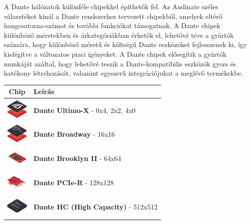 A Dante hálózatok különféle chipekkel építhetők fel. Az Audinate széles választékot 
kínál a Dante rendszerhez tervezett chipekből, amelyek eltérő hangcsatorna-számot 
és további funkciókat támogatnak. A Dante chipek különböző méretekben és árkategóriákban 
érhetők el, lehetővé téve a gyártók számára, hogy különböző méretű és költségű Dante 
eszközöket fejlesszenek ki, így kielégítve a változatos piaci igényeket. A Dante chipek 
elősegítik a gyártók munkáját azáltal, hogy lehetővé teszik a Dante-kompatibilis eszközök 
gyors és hatékony létrehozását, valamint egyszerű integrációjukat a meglévő termékekbe.


\begin{center}
	\begin{tabular}{|c|p{10cm}|}
		\hline
		\textbf{Chip} & \textbf{Leírás} \\
		\hline
		\includegraphics[width=40px,height=40px,keepaspectratio]{figures/ultimo-x.jpg} & \textbf{Dante Ultimo-X} - 0x4, 2x2, 4x0 \\
		\hline
		\includegraphics[width=40px,height=40px,keepaspectratio]{figures/broadway.jpg} & \textbf{Dante Broadway} - 16x16 \\
		\hline
		\includegraphics[width=40px,height=40px,keepaspectratio]{figures/brooklyn-ii.jpg} & \textbf{Dante Brooklyn II} - 64x64 \\
		\hline
		\includegraphics[width=40px,height=40px,keepaspectratio]{figures/pcie-r.jpg} & \textbf{Dante PCIe-R} - 128x128 \\
		\hline
		\includegraphics[width=40px,height=40px,keepaspectratio]{figures/dante-hc.jpg} & \textbf{Dante HC (High Capacity)} - 512x512 \\

\end{tabular}
\end{center}
